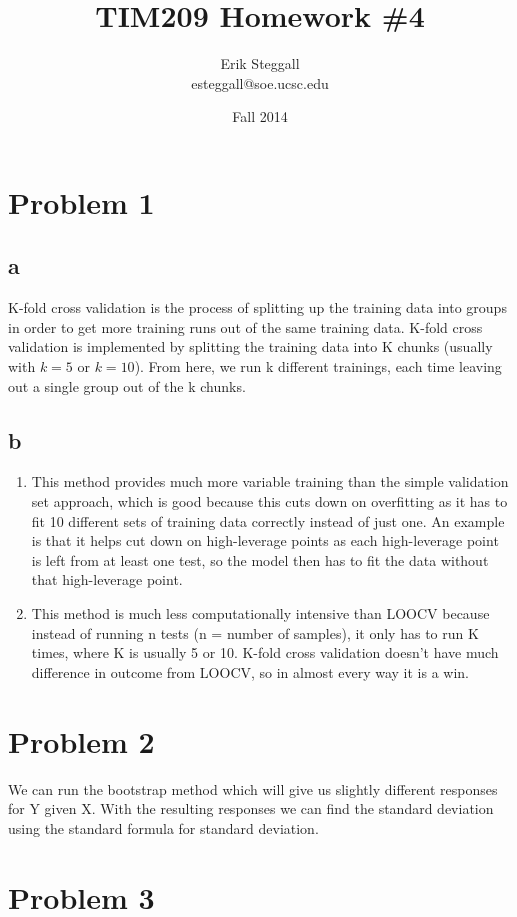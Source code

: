 \documentclass{article}
\title{TIM209 Homework \#4}
\author{Erik Steggall \\ esteggall@soe.ucsc.edu}
\date{Fall 2014}
\begin{document}
 \maketitle \pagestyle{empty}
\section*{Problem 1}
\subsection*{a}
K-fold cross validation is the process of splitting up the training data into groups in order to get more training runs out of the same training data. K-fold cross validation is implemented by splitting the training data into K chunks (usually with $k = 5$ or $k = 10$). From here, we run k different trainings, each time leaving out a single group out of the k chunks. 
\subsection*{b}
\begin{enumerate}[label=(\roman*)]
    \item This method provides much more variable training than the simple validation set approach, which is good because this cuts down on overfitting as it has to fit 10 different sets of training data correctly instead of just one. An example is that it helps cut down on high-leverage points as each high-leverage point is left from at least one test, so the model then has to fit the data without that high-leverage point.\\
    \item This method is much less computationally intensive than LOOCV because instead of running n tests (n = number of samples), it only has to run K times, where K is usually 5 or 10. K-fold cross validation doesn't have much difference in outcome from LOOCV, so in almost every way it is a win.\\
\end{enumerate}
\section*{Problem 2}
We can run the bootstrap method which will give us slightly different responses for Y given X. With the resulting responses we can find the standard deviation using the standard formula for standard deviation.\\

\section*{Problem 3}
\end{document}
